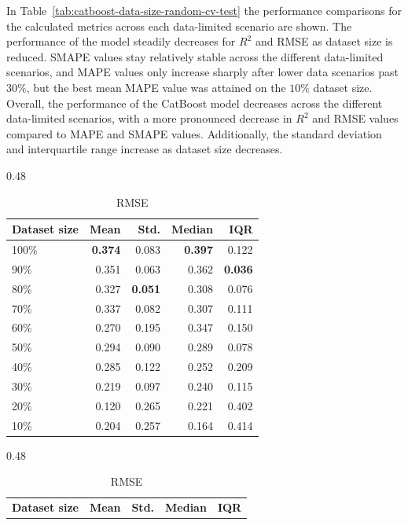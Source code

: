 In Table~\ref{tab:catboost-data-size-random-cv-test} the performance comparisons for the calculated metrics across each data-limited scenario are shown. The performance of the model steadily decreases for \(R^2\) and RMSE as dataset size is reduced. SMAPE values stay relatively stable across the different data-limited scenarios, and MAPE values only increase sharply after lower data scenarios past \(30\%\), but the best mean MAPE value was attained on the \(10\%\) dataset size. Overall, the performance of the CatBoost model decreases across the different data-limited scenarios, with a more pronounced decrease in \(R^2\) and RMSE values compared to MAPE and SMAPE values. Additionally, the standard deviation and interquartile range increase as dataset size decreases.
\begin{table}[ht]
\centering
\caption{CatBoost performance across varying dataset-size.}
\label{tab:catboost-data-size-random-cv-test}
\begin{subtable}{0.48\textwidth}
\centering
\small
\caption{\(R^2\)}
\label{tab:r2-catboost-data-size-random-cv}
\begin{tabular}{lrrrr}
\toprule
\textbf{Dataset size} & \textbf{Mean} & \textbf{Std.} & \textbf{Median} & \textbf{IQR} \\
\midrule
100\% & \textbf{0.374} & 0.083 & \textbf{0.397} & 0.122 \\
90\%  & 0.351 & 0.063 & 0.362 & \textbf{0.036} \\
80\%  & 0.327 & \textbf{0.051} & 0.308 & 0.076 \\
70\%  & 0.337 & 0.082 & 0.307 & 0.111 \\
60\%  & 0.270 & 0.195 & 0.347 & 0.150 \\
50\%  & 0.294 & 0.090 & 0.289 & 0.078 \\
40\%  & 0.285 & 0.122 & 0.252 & 0.209 \\
30\%  & 0.219 & 0.097 & 0.240 & 0.115 \\
20\%  & 0.120 & 0.265 & 0.221 & 0.402 \\
10\%  & 0.204 & 0.257 & 0.164 & 0.414 \\
\bottomrule
\end{tabular}
\end{subtable}
\hfill
\begin{subtable}{0.48\textwidth}
\centering
\small
\caption{RMSE}
\label{tab:rmse-catboost-data-size-random-cv}
\begin{tabular}{lrrrr}
\toprule
\textbf{Dataset size} & \textbf{Mean} & \textbf{Std.} & \textbf{Median} & \textbf{IQR} \\

\end{tabular}
\end{subtable}
\end{table}
